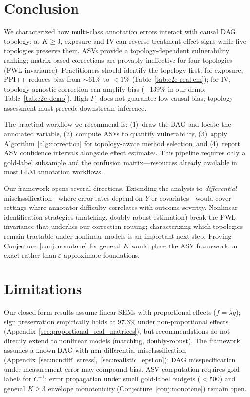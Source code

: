 \section{Conclusion}
\label{sec:conclusion}

We characterized how multi-class annotation errors interact with causal DAG topology: at $K{\geq}3$, exposure and IV can reverse treatment effect signs while five topologies preserve them. ASVs provide a topology-dependent vulnerability ranking; matrix-based corrections are provably ineffective for four topologies (FWL invariance). Practitioners should identify the topology first: for exposure, PPI++ reduces bias from ${\sim}61\%$ to ${<}1\%$ (Table~\ref{tab:e2e-real-cm}); for IV, topology-agnostic correction can amplify bias ($-$139\% in our demo; Table~\ref{tab:e2e-demo}). High $F_1$ does not guarantee low causal bias; topology assessment must precede downstream inference.

The practical workflow we recommend is: (1)~draw the DAG and locate the annotated variable, (2)~compute ASVs to quantify vulnerability, (3)~apply Algorithm~\ref{alg:correction} for topology-aware method selection, and (4)~report ASV confidence intervals alongside effect estimates. This pipeline requires only a gold-label subsample and the confusion matrix---resources already available in most LLM annotation workflows.

Our framework opens several directions. Extending the analysis to \emph{differential} misclassification---where error rates depend on $Y$ or covariates---would cover settings where annotator difficulty correlates with outcome severity. Nonlinear identification strategies (matching, doubly robust estimation) break the FWL invariance that underlies our correction routing; characterizing which topologies remain tractable under nonlinear models is an important next step. Proving Conjecture~\ref{conj:monotone} for general $K$ would place the ASV framework on exact rather than $\varepsilon$-approximate foundations.

\section*{Limitations}

Our closed-form results assume linear SEMs with proportional effects ($f{=}\lambda g$); sign preservation empirically holds at 97.3\% under non-proportional effects (Appendix~\ref{sec:proportional_real_matrices}), but recommendations do not directly extend to nonlinear models (matching, doubly-robust). The framework assumes a known DAG with non-differential misclassification (Appendix~\ref{sec:nondiff_stress},~\ref{sec:realistic_epsilon}); DAG misspecification under measurement error may compound bias. ASV computation requires gold labels for $C^{-1}$; error propagation under small gold-label budgets ($<$500) and general $K{\geq}3$ envelope monotonicity (Conjecture~\ref{conj:monotone}) remain open.
